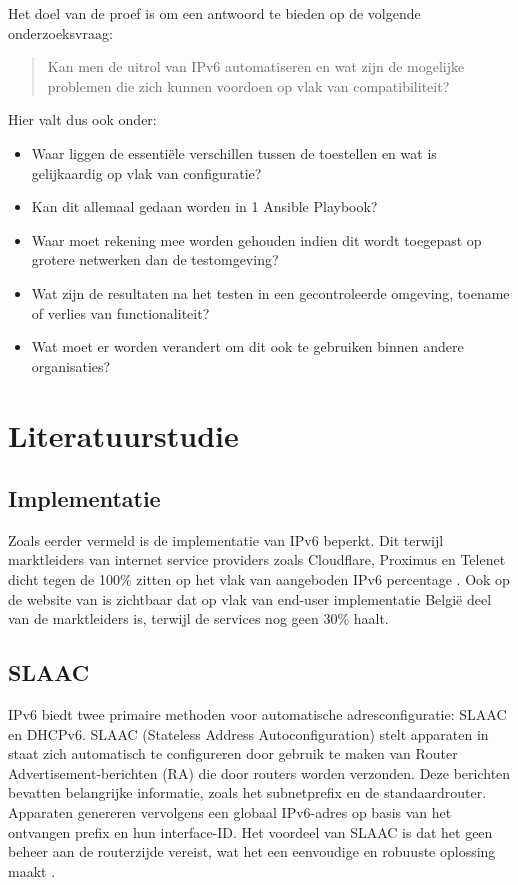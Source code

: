 Het doel van de proef is om een antwoord te bieden op de volgende onderzoeksvraag:
\begin{quote}
    Kan men de uitrol van IPv6 automatiseren en wat zijn de mogelijke problemen die zich kunnen voordoen op vlak van compatibiliteit?
\end{quote}

Hier valt dus ook onder:
\begin{itemize}
    \item Waar liggen de essentiële verschillen tussen de toestellen en wat is gelijkaardig op vlak van configuratie?
    \item Kan dit allemaal gedaan worden in 1 Ansible Playbook?
    \item Waar moet rekening mee worden gehouden indien dit wordt toegepast op grotere netwerken dan de testomgeving?
    \item Wat zijn de resultaten na het testen in een gecontroleerde omgeving, toename of verlies van functionaliteit?
    \item Wat moet er worden verandert om dit ook te gebruiken binnen andere organisaties?
\end{itemize}


\section{Literatuurstudie}%
\label{sec:literatuurstudie}

\subsection{Implementatie}
\label{sec:implementatie}

Zoals eerder vermeld is de implementatie van IPv6 beperkt. 
Dit terwijl marktleiders van internet service providers zoals Cloudflare, Proximus en Telenet dicht tegen de 100\% zitten op het vlak van aangeboden IPv6 percentage \autocite{Test2024}. 
Ook op de website van \textcite{EuropeanCommission} is zichtbaar dat op vlak van end-user implementatie België deel van de marktleiders is, terwijl de services nog geen 30\% haalt.

\subsection{SLAAC}
\label{sec:SLAAC}

IPv6 biedt twee primaire methoden voor automatische adresconfiguratie: SLAAC en DHCPv6. 
SLAAC (Stateless Address Autoconfiguration) stelt apparaten in staat zich automatisch te configureren door gebruik te maken van Router \\ Advertisement-berichten (RA) die door routers worden verzonden. 
Deze berichten bevatten belangrijke informatie, zoals het subnetprefix en de standaardrouter. Apparaten genereren vervolgens een globaal IPv6-adres op basis van het ontvangen prefix en hun interface-ID. 
Het voordeel van SLAAC is dat het geen beheer aan de routerzijde vereist, wat het een eenvoudige en robuuste oplossing maakt \autocite{Maris2024}.
\\

